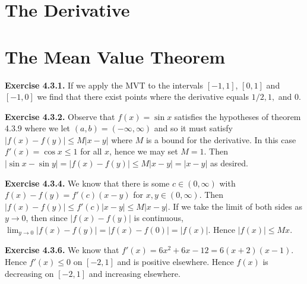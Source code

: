 \documentclass[12pt]{book}
\newenvironment{exercise}[2][Exercise]{\begin{trivlist}
\item[\hskip \labelsep {\bfseries #1}\hskip \labelsep {\bfseries #2.}]}{\end{trivlist}}
\newcommand{\prb}[1]{\textbf{Exercise #1.}}
\begin{document}
\section{The Derivative}



\section{The Mean Value Theorem}

\begin{exercise}{4.3.1}
\end{exercise}

\prb{4.3.1} If we apply the MVT to the intervals $[-1, 1]$, $[0, 1]$ and $[-1, 0]$ we find that there exist points where the derivative equals $1/2, 1,$ and $0$. 

\prb{4.3.2} Observe that $f(x) = \sin x$ satisfies the hypotheses of theorem 4.3.9 where we let $(a,b) = (-\infty, \infty)$ and so it must satisfy $|f(x) - f(y)| \leq M |x-y|$ where $M$ is a bound for the derivative. In this case $f'(x) = \cos x \leq 1$ for all $x$, hence we may set $M = 1$. Then $|\sin x - \sin y| = |f(x) - f(y)| \leq M |x-y| = |x-y|$ as desired.

\begin{exercise}{4.3.3}
\end{exercise}

\prb{4.3.4} We know that there is some $c \in (0, \infty)$ with $f(x) - f(y) = f'(c) (x-y)$ for $x, y \in (0, \infty)$. Then $|f(x) - f(y)| \leq f'(c) |x-y| \leq M|x-y|$. If we take the limit of both sides as $y \rightarrow 0$, then since $|f(x) - f(y)|$ is continuous, $\displaystyle \lim_{y \rightarrow 0} |f(x) - f(y)| = |f(x) - f(0)| = |f(x)|$. Hence $|f(x)| \leq Mx$. 

\begin{exercise}{4.3.5}
\end{exercise}

\prb{4.3.6} We know that $f'(x) = 6x^2 + 6x - 12 = 6(x+2)(x-1)$. Hence $f'(x) \leq 0$ on $[-2, 1]$ and is positive elsewhere. Hence $f(x)$ is decreasing on $[-2, 1]$ and increasing elsewhere. 

\begin{exercise}{4.3.7}
\end{exercise}


\begin{exercise}{4.3.8}
\end{exercise}
\end{document}
